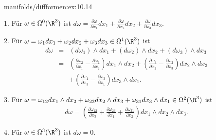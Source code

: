 \documentclass[letterpaper,10pt,german]{jupyterBook}
\begin{document}
\begin{example}{}{manifolds/diffformen:ex:10.14}



\par
1. Für \(\omega\in\Omega^0(\R^3)\) ist \(d\omega = \frac{\partial\omega}{\partial x_1}dx_1+
\frac{\partial\omega}{\partial x_2}dx_2+\frac{\partial\omega}{\partial x_3}dx_3\).



\par
2. Für \(\omega = \omega_1dx_1+\omega_2dx_2+\omega_3dx_3\in\Omega^1(\R^3)\) ist
\begin{align*}
d\omega &=& (d\omega_1)\wedge dx_1+(d\omega_2)\wedge dx_2+(d\omega_3)\wedge
dx_3\\
&=& \left(\frac{\partial\omega_2}{\partial x_1}-\frac{\partial\omega_1}{\partial x_2}\right)
dx_1\wedge dx_2+ \left(\frac{\partial\omega_3}{\partial x_2}-\frac{\partial\omega_2}{\partial x_3}\right)
dx_2\wedge dx_3\\
&& + \left(\frac{\partial\omega_1}{\partial x_3}-\frac{\partial\omega_3}{\partial x_1}\right)
dx_3\wedge dx_1.
\end{align*}


\par
3. Für \(\omega = \omega_{12}dx_1\wedge dx_2+\omega_{23}dx_2\wedge dx_3
+\omega_{31}dx_3\wedge dx_1 \in\Omega^2(\R^3)\) ist
\begin{align*}
d\omega = \left(\frac{\partial\omega_{12}}{\partial x_3} + \frac{\partial\omega_{23}}{\partial x_1}
+ \frac{\partial\omega_{31}}{\partial x_2}\right)dx_1\wedge dx_2\wedge dx_3.
\end{align*}


\par
4. Für \(\omega\in\Omega^3(\R^3)\) ist \(d\omega=0\).
\end{example}
\end{document}
